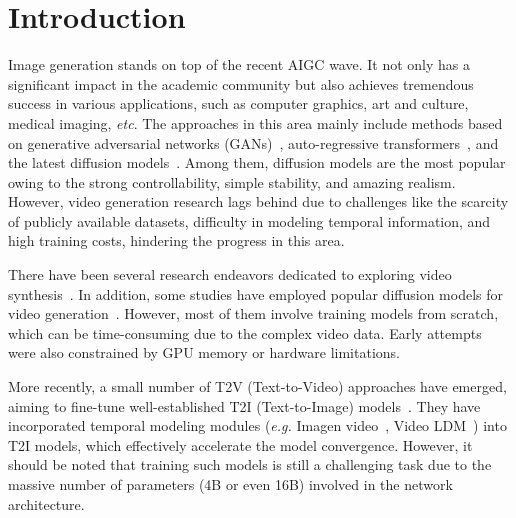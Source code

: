 \section{Introduction}

Image generation stands on top of the recent AIGC wave.
It not only has a significant impact in the academic community but also achieves tremendous success in various applications, such as computer graphics, art and culture, medical imaging, \emph{etc}. The approaches in this area mainly include methods based on generative adversarial networks (GANs)~\cite{gan,aliasgan,stylegan,stylegan2,stylegan3}, auto-regressive transformers~\cite{taming,zeroshot,scaling}, and the latest diffusion models~\cite{diffusionbeatgan,ddpm,improvedddpm,cascaded,glide,dalle,stablediffusion,imagen, song2020score,feng2023ernie,liu2022compositional,xue2023raphael}.
Among them, diffusion models are the most popular owing to the strong controllability, simple stability, and amazing realism. 
However, video generation research lags behind due to challenges like the scarcity of publicly available datasets, difficulty in modeling temporal information, and high training costs, hindering the progress in this area.

There have been several research endeavors dedicated to exploring video synthesis~\cite{babaeizadeh2017stochastic,brooks2022generating,castrejon2019improved,denton2018stochastic,franceschi2020stochastic,ge2022long,gupta2022rv,gupta2018imagine, hong2022cogvideo, kahembwe2020lower,lee2018stochastic, li2018video, luc2020transformation, mittal2017sync, marwah2017attentive, pan2017create, saito2020train, skorokhodov2022stylegan, tian2021good, villegas2017decomposing, vondrick2016generating,weissenborn2019scaling,wu2021godiva, yan2021videogpt, yu2022generating}. In addition, some studies have employed popular diffusion models for video generation~\cite{harvey2022flexible,vdm,hoppe2022diffusion,voleti2022masked,yang2022diffusion, videofusion}. However, most of them involve training models from scratch, which can be time-consuming due to the complex video data. Early attempts were also constrained by GPU memory or hardware limitations.

More recently, a small number of T2V (Text-to-Video) approaches have emerged, aiming to fine-tune well-established T2I (Text-to-Image) models~\cite{ho2022imagenvideo, videoLDM, latentshift,videofactory, videofusion, magicvideo, preserve}. 
They have incorporated temporal modeling modules (\emph{e.g.} Imagen video~\cite{ho2022imagenvideo}, Video LDM~\cite{videoLDM}) into
T2I models, which effectively accelerate the model convergence.
However, it should be noted that training such models is still a challenging task due to the massive number of parameters (4B or even 16B) involved in the network architecture. 

